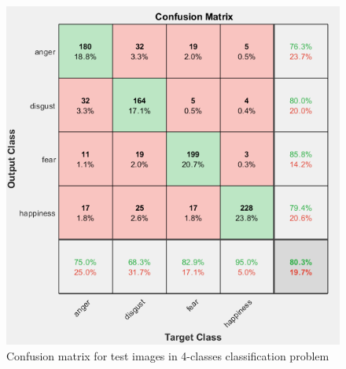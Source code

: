\documentclass[a4paper]{report}
\begin{document}
	\begin{figure}[htbp]
		\centering
		\includegraphics[scale=0.7]{img/confusion_4class.png}
		\caption{Confusion matrix for test images in 4-classes classification problem}
		\label{img: confusion4classes}
	\end{figure}
\end{document}
